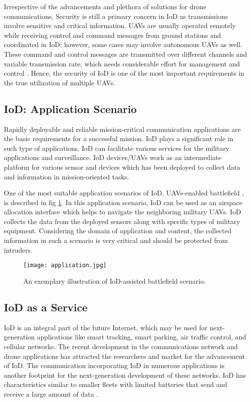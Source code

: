 \documentclass{easychair}
\begin{document}
Irrespective of the advancements and plethora of solutions for drone communications, Security is still a primary concern in IoD as transmissions involve sensitive and critical information. UAVs are usually operated remotely while receiving control and command messages from ground stations and coordinated in IoD; however, some cases may involve autonomous UAVs as well. These command and control messages are transmitted over different channels and variable transmission rate, which needs considerable effort for management and control \cite{sharma2018dptr}. Hence, the security of IoD is one of the most important requirements in the true utilization of multiple UAVs.

\subsection{IoD: Application Scenario}
\label{sect:IoD_app}
Rapidly deployable and reliable mission-critical communication applications are the basic requirements for a successful mission. IoD plays a significant role in such type of applications. IoD can facilitate various services for the military applications and surveillance. IoD devices/UAVs work as an intermediate platform for various sensor and devices which has been deployed to collect data and information in mission-oriented tasks.

One of the most suitable application scenarios of IoD, UAVs-enabled battlefield \cite{springer2013military}, is described in fig \ref{IoD_sci}. In this application scenario, IoD can be used as an airspace allocation interface which helps to navigate the neighboring military UAVs. IoD collects the data from the deployed sensors along with specific types of military equipment. Considering the domain of application and content, the collected information in such a scenario is very critical and should be protected from intruders.

\begin{figure}[ht!]
\centering
\texttt{[image: application.jpg]}
\caption{An exemplary illustration of IoD-assisted battlefield scenario.}
\label{IoD_sci}
\end{figure}
\subsection{IoD as a Service}
\label{sect:IoD_Next}
IoD is an integral part of the future Internet, which may be used for next-generation applications like smart tracking, smart parking, air traffic control, and cellular networks. The recent development in the communications network and drone applications has attracted the researchers and market for the advancement of IoD. The communication incorporating IoD in numerous applications is another footprint for the next-generation development of these networks. IoD has characteristics similar to smaller fleets with limited batteries that send and receive a large amount of data \cite{zancul2016business}\cite{andersen2017enabling}.
\end{document}
